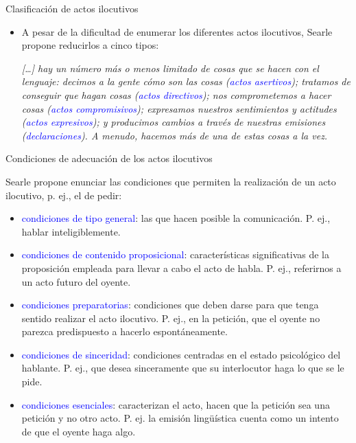 \documentclass{beamer}
\begin{document}
\begin{frame}{Clasificación de actos ilocutivos}

	\begin{itemize}
		\item A pesar de la dificultad de enumerar los diferentes actos ilocutivos, Searle propone reducirlos a cinco tipos:
		\vspace{0.2cm}

		 \it{[\ldots] hay un número más o menos limitado de cosas que se hacen con el lenguaje: decimos a la gente cómo son las cosas (\textcolor{blue}{actos asertivos}); tratamos de conseguir que hagan cosas (\textcolor{blue}{actos directivos}); nos comprometemos a hacer cosas (\textcolor{blue}{actos compromisivos}); expresamos nuestros sentimientos y actitudes (\textcolor{blue}{actos expresivos}); y producimos cambios a través de nuestras emisiones (\textcolor{blue}{declaraciones}). A menudo, hacemos más de una de estas cosas a la vez.}
	\end{itemize}

\end{frame}

\begin{frame}{Condiciones de adecuación de los actos ilocutivos}

	Searle propone enunciar las condiciones que permiten la realización de un acto ilocutivo, p. ej., el de pedir:
	
	\begin{itemize}
		\item \textcolor{blue}{condiciones de tipo general}: las que hacen posible la comunicación. P. ej., hablar inteligiblemente.
		\item \textcolor{blue}{condiciones de contenido proposicional}: características significativas de la proposición empleada para llevar a cabo el acto de habla. P. ej., referirnos a un acto futuro del oyente.
		\item \textcolor{blue}{condiciones preparatorias}: condiciones que deben darse para que tenga sentido realizar el acto ilocutivo. P. ej., en la petición, que el oyente no parezca predispuesto a hacerlo espontáneamente. 
		\item \textcolor{blue}{condiciones de sinceridad}: condiciones centradas en el estado psicológico del hablante. P. ej., que desea sinceramente que su interlocutor haga lo que se le pide.
		\item \textcolor{blue}{condiciones esenciales}: caracterizan el acto, hacen que la petición sea una petición y no otro acto. P. ej. la emisión lingüística cuenta como un intento de que el oyente haga algo. 
	\end{itemize}

\end{frame}
\end{document}
